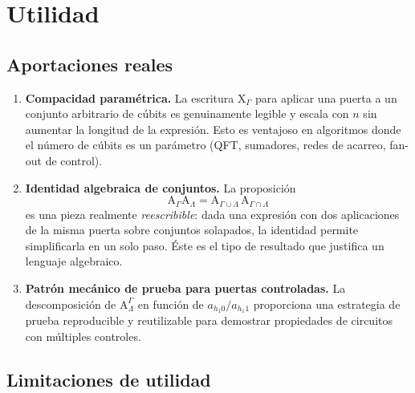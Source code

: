 \documentclass[12pt, a4paper]{article}
\newcommand{\gate}[1]{\text{#1}}
\newcommand{\stategate}[3]{\gate{#1}^{#2}_{#3}}
\begin{document}
\section{Utilidad}

\subsection{Aportaciones reales}

\begin{enumerate}
  \item \textbf{Compacidad paramétrica.}
        La escritura $\gate{X}_\Gamma$ para aplicar una puerta a un conjunto
        arbitrario de cúbits es genuinamente legible y escala con $n$ sin
        aumentar la longitud de la expresión. Esto es ventajoso en algoritmos
        donde el número de cúbits es un parámetro (QFT, sumadores, redes de
        acarreo, fan-out de control).

  \item \textbf{Identidad algebraica de conjuntos.}
        La proposición
        \[
          \gate{A}_\Gamma \gate{A}_\Lambda
          = \gate{A}_{\Gamma \cup \Lambda}\, \gate{A}_{\Gamma \cap \Lambda}
        \]
        es una pieza realmente \emph{reescribible}: dada una expresión con
        dos aplicaciones de la misma puerta sobre conjuntos solapados, la
        identidad permite simplificarla en un solo paso. Éste es el tipo de
        resultado que justifica un lenguaje algebraico.

  \item \textbf{Patrón mecánico de prueba para puertas controladas.}
        La descomposición de $\stategate{A}{\Gamma}{\Lambda}$ en función de
        $a_{h_1 0}/a_{h_1 1}$ proporciona una estrategia de prueba
        reproducible y reutilizable para demostrar propiedades de circuitos
        con múltiples controles.
\end{enumerate}

\subsection{Limitaciones de utilidad}
\end{document}
